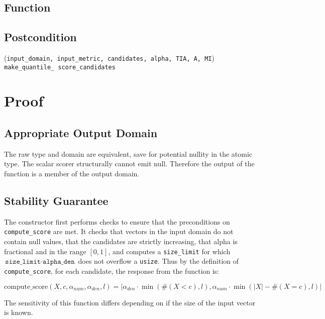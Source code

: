 \documentclass{article}
\begin{document}
\subsection*{Function}
\label{sec:python-pseudocode}



\subsection*{Postcondition}
\validTransformation
    {(\texttt{input\_domain, input\_metric, candidates, alpha, TIA, A, MI})}
    {\texttt{make\_quantile\_ score\_candidates}}

\section{Proof}
\subsection{Appropriate Output Domain}
\label{sec:approp-output-domain}
The raw type and domain are equivalent, save for potential nullity in the atomic type. 
The scalar scorer structurally cannot emit null.
Therefore the output of the function is a member of the output domain.

\subsection{Stability Guarantee}

The constructor first performs checks to ensure that the preconditions on \texttt{compute\_score} are met.
It checks that vectors in the input domain do not contain null values,
that the candidates are strictly increasing,
that alpha is fractional and in the range $[0, 1]$,
and computes a \texttt{size\_limit} for which $\texttt{size\_limit} \cdot \texttt{alpha\_den}$ does not overflow a \texttt{usize}.
Thus by the definition of \texttt{compute\_score}, for each candidate, the response from the function is:

\begin{equation}
    \textrm{compute\_score}(X, c, \alpha_{num}, \alpha_{den}, l) = |\alpha_{den} \cdot \min(\#(X < c), l), \alpha_{num} \cdot \min(|X| - \#(X = c), l)|
\end{equation}

The sensitivity of this function differs depending on if the size of the input vector is known.
\end{document}
